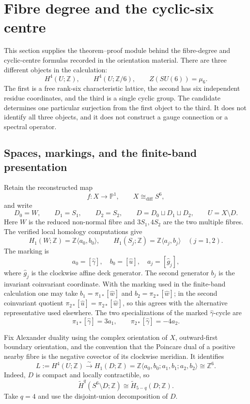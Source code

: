 \section{Fibre degree and the cyclic-six centre}
\label{zdc:sec:bridge}

This section supplies the theorem--proof module behind the fibre-degree and
cyclic-centre formulas recorded in the orientation material.  There are three
different objects in the calculation:
\[
 H^4(U;\mathbb Z),\qquad H^4(U;\mathbb Z/6),\qquad
 Z(SU(6))=\mu _6.
\]
The first is a free rank-six characteristic lattice, the second has six
independent residue coordinates, and the third is a single cyclic group.
The candidate determines one particular surjection from the first object to
the third.  It does not identify all three objects, and it does not construct
a gauge connection or a spectral operator.

\subsection{Spaces, markings, and the finite-band presentation}
\label{zdc:subsec:markings}

Retain the reconstructed map
\[
 f:X\longrightarrow\mathbb P^1,
 \qquad X\cong_{\mathrm{diff}}S^6,
\]
and write
\[
 D_0=W,\qquad D_1=S_1,\qquad D_2=S_2,
 \qquad D=D_0\sqcup D_1\sqcup D_2,
 \qquad U=X\setminus D.
\]
Here $W$ is the reduced non-normal fibre and $3S_1,4S_2$ are the
two multiple fibres.  The verified local homology computations give
\[
 H_1(W;\mathbb Z)=\mathbb Z\langle a_0,b_0\rangle,
 \qquad
 H_1(S_j;\mathbb Z)=\mathbb Z\langle a_j,b_j\rangle
 \quad(j=1,2).
\]
The marking is
\[
 a_0=[\widehat\gamma],\quad b_0=[\widehat u],
 \quad a_j=[\widehat g_j],
\]
where $\widehat g_j$ is the clockwise affine deck generator.  The second
generator $b_j$ is the invariant coinvariant coordinate.  With the
marking used in the finite-band calculation one may take
\(b_1=\pi_{1*}[\widehat w]\) and
\(b_2=\pi_{2*}[\widehat w]\); in the second coinvariant quotient
\(\pi_{2*}[\widehat u]=\pi_{2*}[\widehat w]\), so this agrees with the
alternative representative used elsewhere.  The two specializations of
the marked $\widehat\gamma$-cycle are
\begin{equation}
 \pi_{1*}[\widehat\gamma]=3a_1,
 \qquad
 \pi_{2*}[\widehat\gamma]=-4a_2.
 \label{zdc:eq:gamma-specializations}
\end{equation}

Fix Alexander duality using the complex orientation of $X$, outward-first
boundary orientation, and the convention that the Poincare dual of a
positive nearby fibre is the negative covector of its clockwise meridian.
It identifies
\begin{equation}
 L:=H^4(U;\mathbb Z)
 \xrightarrow{\ \sim\ }
 H_1(D;\mathbb Z)
 =\mathbb Z\langle a_0,b_0;a_1,b_1;a_2,b_2\rangle
  \cong\mathbb Z^6.
 \label{zdc:eq:defect-lattice}
\end{equation}
Indeed, $D$ is compact and locally contractible, so
\[
 \widetilde H^q(S^6\setminus D;\mathbb Z)
 \cong\widetilde H_{5-q}(D;\mathbb Z).
\]
Take $q=4$ and use the disjoint-union decomposition of $D$.

